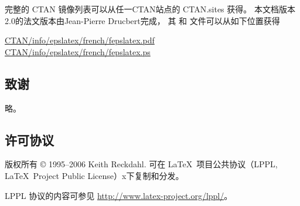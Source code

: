 完整的 CTAN 镜像列表可以从任一CTAN站点的 CTAN.sites 获得。
本文档版本2.0的法文版本由Jean-Pierre Drucbert完成，
其  和  文件可以从如下位置获得
\begin{center}
	\href{ftp://ctan.tug.org/tex-archive/info/epslatex/french/fepslatex.pdf}{CTAN/info/epslatex/french/fepslatex.pdf} \\
	\href{ftp://ctan.tug.org/tex-archive/info/epslatex/french/fepslatex.ps}{CTAN/info/epslatex/french/fepslatex.ps}
\end{center}

\subsection*{致谢}
略。

\subsection*{许可协议}
版权所有 \copyright{} 1995--2006  Keith Reckdahl.
可在 \LaTeX\ 项目公共协议（LPPL, \LaTeX\ Project Public License）x下复制和分发。

LPPL 协议的内容可参见 \url{http://www.latex-project.org/lppl/}。

%
%

\clearpage
\endinput
